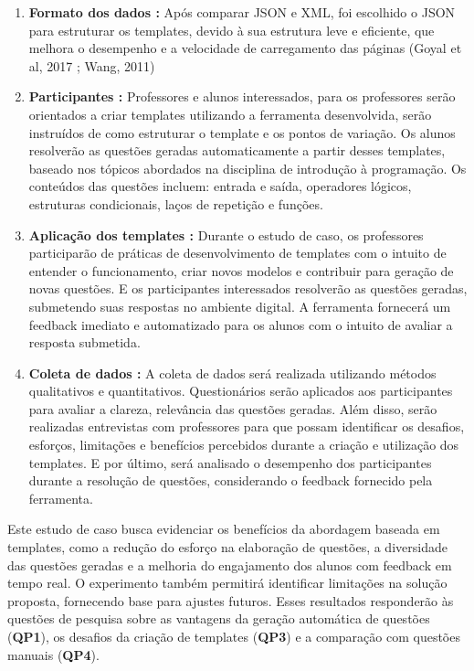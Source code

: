 \begin{enumerate}[label=\textbf{\alph*)}]
    \item \textbf{Formato dos dados :}  Após comparar JSON e XML, foi escolhido o JSON para estruturar os templates, devido à sua estrutura leve e eficiente, que melhora o desempenho e a velocidade de carregamento das páginas (Goyal et al, 2017 ; Wang, 2011)
    \item \textbf{Participantes :}  Professores e alunos interessados, para os professores serão orientados a criar templates utilizando a ferramenta desenvolvida, serão instruídos de como estruturar o template e os pontos de variação. Os alunos resolverão as questões geradas automaticamente a partir desses templates, baseado nos tópicos abordados na disciplina de introdução à programação. Os conteúdos das questões incluem: entrada e saída, operadores lógicos, estruturas condicionais, laços de repetição e funções. 
    \item \textbf{Aplicação dos templates :} Durante o estudo de caso, os professores participarão de práticas de desenvolvimento de templates com o intuito de entender o funcionamento, criar novos modelos e contribuir para geração de novas questões. E os participantes interessados resolverão as questões geradas, submetendo suas respostas no ambiente digital. A ferramenta fornecerá um feedback imediato e automatizado para os alunos com o intuito de avaliar a resposta submetida.
    \item \textbf{Coleta de dados  :} A coleta de dados será realizada utilizando métodos qualitativos e quantitativos. Questionários serão aplicados aos participantes para avaliar a clareza, relevância das questões geradas. Além disso, serão realizadas entrevistas com professores para que possam identificar os desafios, esforços, limitações e benefícios percebidos durante a criação e utilização dos templates. E por último, será analisado o desempenho dos participantes durante a resolução de questões, considerando o feedback fornecido pela ferramenta.

\end{enumerate}

Este estudo de caso busca evidenciar os benefícios da abordagem baseada em templates, como a redução do esforço na elaboração de questões, a diversidade das questões geradas e a melhoria do engajamento dos alunos com feedback em tempo real. O experimento também permitirá identificar limitações na solução proposta, fornecendo base para ajustes futuros. Esses resultados responderão às questões de pesquisa sobre as vantagens da geração automática de questões (\textbf{QP1}), os desafios da criação de templates (\textbf{QP3}) e a comparação com questões manuais (\textbf{QP4}).

